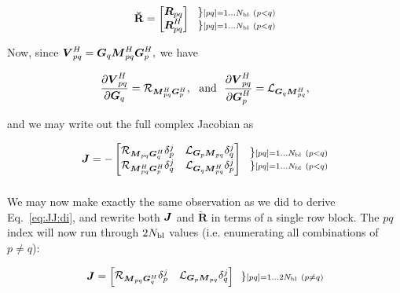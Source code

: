 \documentclass[useAMS,usenatbib]{mn2e}
\makeatletter
\newcommand{\mat}[1]{{\bmath{#1}}}
\newcommand{\JJ}{\mat{J}} %
\newcommand{\MM}{\mat{M}}
\newcommand{\RR}{\mat{R}}
\newcommand{\VV}{\mat{V}}
\newcommand{\GG}{\mat{G}}
\newcommand{\Matrix}[2]{\left [ \begin{array}{@{}#1@{}}#2\end{array} \right ]}
\newcommand{\Stack}[1]{\begin{array}{@{}c@{}}#1\end{array}}
\newcommand{\AUGx}[1]{\mathbf{\breve{#1}}}
\newcommand{\RRr}{\AUGx{R}}
\newcommand{\Rop}[1]{\mathcal{R}_{{#1}}}
\newcommand{\Lop}[1]{\mathcal{L}_{{#1}}}
\numberwithin{equation}{section} %
\providecommand{\DIFaddbegin}{} %
\providecommand{\DIFaddend}{} %
\providecommand{\DIFdelbegin}{} %
\providecommand{\DIFdelend}{} %
\makeatother
\begin{document}
\DIFdelend \begin{equation}
\RRr = 
\Matrix{c}{
  \RR_{pq} \\ 
  \RR^H_{pq} 
} 
~~ 
\Stack{ 
\} \scriptstyle [pq]=1\dots \Nbl~(p<q) \\ 
\} \scriptstyle [pq]=1\dots \Nbl~(p<q) 
}
\label{eq:RRtranspose}
\end{equation}
\DIFdelbegin %


\DIFdelend Now, since $\VV^H_{pq}=\GG_q \MM^H_{pq} \GG^H_p,$ we have
\DIFdelbegin %

\DIFdelend \begin{equation}
\label{eq:dRH:dG}
\frac{\partial\VV^H_{pq}}{\partial\GG_q} = \Rop{\MM^H_{pq}\GG^H_p},\mathrm{~~and~~}
\frac{\partial\VV^H_{pq}}{\partial\GG^H_p} = \Lop{\GG_q \MM^H_{pq}},
\end{equation}
\DIFdelbegin %

\DIFdelend and we may write out the full complex Jacobian as
\DIFdelbegin %

\DIFdelend \DIFaddbegin \begin{equation}
\DIFaddend \JJ = - \Matrix{cc}{ 
\Rop{ \MM_{pq}\GG^H_q }\delta^j_p & 
\Lop{ \GG_p \MM_{pq}  }\delta^j_q \\
\Rop{ \MM^H_{pq} \GG^H_p } \delta^j_q & 
\Lop{ \GG_q \MM^H_{pq}  } \delta^j_p  
}~~ 
\Stack{ 
\} \scriptstyle [pq]=1\dots \Nbl~(p<q) \\ 
\} \scriptstyle [pq]=1\dots \Nbl~(p<q) 
}
\DIFdelbegin %
\end{equation}%
\begin{equation}%
\DIFdelend \DIFaddbegin \end{equation}
\DIFaddend 

We may now make exactly the same observation as we did to derive Eq.~\ref{eq:JJ:di}, and rewrite both $\JJ$ and $\RRr$ in terms of 
a single row block. The $pq$ index will now run through $2N_\mathrm{bl}$ values (i.e. enumerating all combinations of $p\ne q$):
\DIFdelbegin %

\DIFdelend \begin{equation}
\label{eq:JJ:pol}
\JJ = \Matrix{cc}{ 
\Rop{ \MM_{pq}\GG^H_q }\delta^j_p & 
\Lop{ \GG_p \MM_{pq}  }\delta^j_q \\
}~~ 
\} \scriptstyle [pq]=1\dots 2\Nbl~(p\ne q)\\ 
\end{equation}
\DIFdelbegin %
\end{document}
